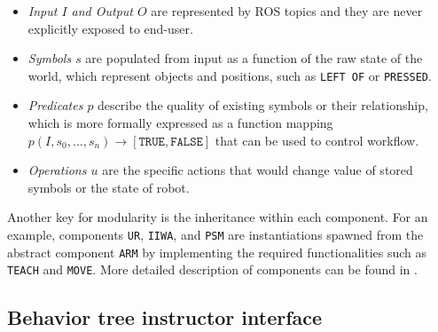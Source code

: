 \documentclass[letterpaper, 10 pt, conference]{ieeeconf}
\begin{document}
\begin{itemize}
\item \textit{Input $I$ and Output $O$} are represented by ROS topics and they are never explicitly exposed to end-user. 
\item \textit{Symbols $s$} are populated from input as a function of the raw state of the world, which represent objects and positions, such as \texttt{LEFT OF} or \texttt{PRESSED}.
\item \textit{Predicates $p$} describe the quality of existing symbols or their relationship, which is more formally expressed as a function mapping $p(I,s_0, ..., s_n) \rightarrow [\texttt{TRUE}, \texttt{FALSE}]$ that can be used to control workflow. 
\item \textit{Operations $u$} are the specific actions that would change value of stored symbols or the state of robot. 

\end{itemize}

Another key for modularity is the inheritance within each component. For an example, components \texttt{UR}, \texttt{IIWA}, and \texttt{PSM} are instantiations spawned from the abstract component \texttt{ARM} by implementing the required functionalities such as \texttt{TEACH} and \texttt{MOVE}. More detailed description of components can be found in \cite{paxton2017costar}.

\subsection{Behavior tree instructor interface}

%
%
\end{document}
